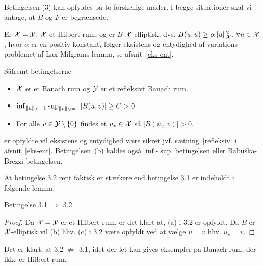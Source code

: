 Betingelsen (3) kan opfyldes på to forskellige måder. I begge
situationer skal vi antage, at $B$ og $F$ er begrænsede.
\begin{userenumerate}{3}
     \item Er $\mathcal{X}=\mathcal{Y}$, $\mathcal{X}$ et Hilbert rum, og er $B$ 
           $\mathcal{X}$-elliptisk, dvs. $B(u,u)\geq \alpha\|u\|_{\mathcal{X}}^2$, $\forall u\in\mathcal{X}$, 
           hvor $\alpha$ er en positiv konstant, følger eksistens og
           entydighed af variations problemet af
           Lax-Milgrams lemma, se afsnit~\ref{eks-ent}. \label{cond31}
     \item Såfremt betingelserne 
           \begin{itemize}
               \item $\mathcal{X}$ er et Banach rum og $\mathcal{Y}$ er et refleksivt
                     Banach rum.
               \item $\inf_{\|u\|_{\mathcal{X}}=1}\sup_{\|v\|_{\mathcal{Y}}=1}|B(u,v)|\geq C>0$.
               \item For alle $v\in \mathcal{Y} \setminus \{0\}$ findes et $u_v\in\mathcal{X}$ 
                     så $|B(u_v,v)| >0$.
           \end{itemize}
           er opfyldte vil eksistens og entydighed være sikret jvf.
           sætning~\ref{refleksiv} i afsnit~\ref{eks-ent}. Betingelsen~(b)
           kaldes også $\inf$-$\sup$ betingelsen eller Babu\v{s}ka-Brezzi 
           be\-tin\-gel\-sen. \label{cond32}
\end{userenumerate}
At betingelse 3.2 rent faktisk er stærkere end betingelse 3.1 er
indeholdt i følgende lemma.
\begin{lemma}
Betingelse 3.1 $\Rightarrow$ 3.2.
\end{lemma}
\begin{proof}
Da $\mathcal{X} =\mathcal{Y}$ er et Hilbert rum, er det klart at, (a) i 3.2 er opfyldt.
Da $B$ er $\mathcal{X}$-elliptisk vil (b) hhv. (c) i 3.2 være opfyldt ved at
vælge $u=v$ hhv. $u_v=v$.
\end{proof}
\begin{remark}
Det er klart, at 3.2 $\not\Rightarrow$ 3.1, idet der let kan gives
eksempler på Banach rum, der ikke er Hilbert rum.
\end{remark}

